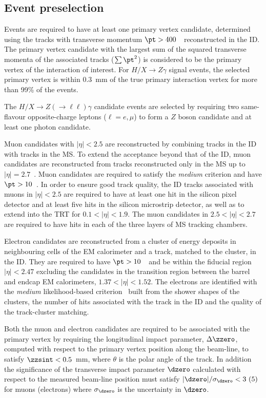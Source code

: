 \subsection{Event preselection}

Events are required to have at least one primary vertex candidate, determined using the tracks
with transverse momentum $\pt > 400$~\MeV\ 
reconstructed in the ID. The primary vertex candidate with the largest sum of the
squared transverse momenta of the associated tracks ($\sum\pt^{2}$) is considered to be the primary
vertex of the interaction of interest. For $H/X\to Z\gamma$ signal events, the selected primary vertex 
is within 0.3~mm of the true primary interaction vertex for more than 99\% of the events.

The $H/X\to Z(\to\ell\ell)\gamma$ candidate events are selected by requiring two same-flavour 
opposite-charge leptons 
($\ell = e, \mu$) to form a $Z$ boson candidate and at least one photon candidate.

Muon candidates with $|\eta|<2.5$ are reconstructed by combining tracks in the ID with tracks in 
the MS. To extend the acceptance beyond that of the ID, muon candidates are
reconstructed from tracks reconstructed only in the MS up to $|\eta| = 2.7$~\cite{Aad:2016jkr}. 
Muon candidates are required to satisfy the \textit{medium} criterion and have $\pt > 10$~\GeV.
In order to ensure good track quality, the ID tracks associated with muons in $|\eta|<2.5$ are 
required to have at least one hit in the silicon pixel detector and at least five hits in the silicon 
microstrip detector, as well as to extend into the TRT for $0.1<|\eta|<1.9$.
The muon candidates in
$2.5 < |\eta| <2.7$ are required to have hits
in each of the three layers of MS tracking chambers.

Electron candidates are reconstructed from a cluster of energy deposits in neighbouring cells of
the EM calorimeter and a track, matched to the cluster, in the ID. 
They are required to have $\pt > 10$~\GeV\ and be within the fiducial region $|\eta|<2.47$
excluding the candidates in the transition region between the barrel and endcap EM calorimeters,
$1.37 < |\eta| < 1.52$. The electrons are identified with the \textit{medium} likelihood-based 
criterion~\cite{ATLAS-electrons} built from the shower
shapes of the clusters, the number of hits associated with the track in the ID and the quality of the track-cluster 
matching. 

Both the muon and electron candidates are required to be associated with the primary vertex
by requiring the longitudinal impact parameter, $\Delta\zzero$, computed with respect to the
primary vertex position along the beam-line,
to satisfy $\zzsint < 0.5$~mm, where $\theta$ is the polar angle of the track.
In addition the significance of the
transverse impact parameter $\dzero$ calculated with respect to the measured beam-line position must satisfy
$|\dzero| / \sigma_{\dzero} < 3~(5)$ for muons (electrons) where $\sigma_{\dzero}$ is the 
uncertainty in $\dzero$. 

